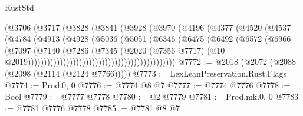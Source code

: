 \begin{lexlean}{RustStd}
\begin{coremodule}
                                            (@3706
                                              (@3717
                                                (@3828
                                                  (@3841
                                                    (@3928
                                                      (@3970
                                                        (@4196
                                                          (@4377
                                                            (@4520
                                                              (@4537
                                                                (@4784
                                                                  (@4913
                                                                    (@4928
                                                                      (@5036
                                                                        (@5051
                                                                          (@6346
                                                                            (@6475
                                                                              (@6492
                                                                                (@6572
                                                                                  (@6966
                                                                                    (@7097
                                                                                      (@7140
                                                                                        (@7286
                                                                                          (@7345
                                                                                            (@2020
                                                                                              (@7356
                                                                                                @7717)
                                                                                              (@10
                                                                                                @2019))))))))))))))))))))))))))))))))))))))))))))))
@7772 := @2018 (@2072 (@2088 (@2098 (@2114 (@2124 @7766)))))
@7773 := LexLeanPreservation.Rust.Flags
@7774 := Prod.{0, 0}
@7776 := @7774 @8 @7
@7777 := @7774 @7776
@7778 := Bool
@7779 := @7777 @7778
@7780 := @2 @7779
@7781 := Prod.mk.{0, 0}
@7783 := @7781 @7776 @7778
@7785 := @7781 @8 @7

\end{coremodule}
\end{lexlean}
